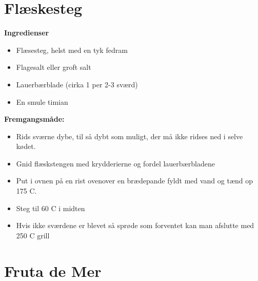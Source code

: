 \documentclass{book}
\begin{document}
\newpage \section{Flæskesteg}
\begin{minipage}[t]{0.5\textwidth}
\textbf{Ingredienser}
\begin{itemize}
    \item Flæsesteg, helst med en tyk fedram
    \item Flagesalt eller groft salt
    \item Lauerbærblade (cirka 1 per 2-3 sværd)
    \item En smule timian
\end{itemize}
\end{minipage}
\begin{minipage}[t]{0.5\textwidth}
\textbf{Fremgangsmåde:}
\begin{itemize}
    \item Rids sværne dybe, til så dybt som muligt, der må ikke ridses ned i selve kødet.
    \item Gnid flæskstengen med krydderierne og fordel lauerbærbladene
    \item Put i ovnen på en rist ovenover en brædepande fyldt med vand og tænd op 175 \degree C. 
    \item Steg til 60 \degree C i midten
    \item Hvis ikke sværdene er blevet så sprøde som forventet kan man afslutte med 250 \degree C grill
\end{itemize}
\end{minipage}
\newpage  {}
\newpage \section{Fruta de Mer}
\end{document}
